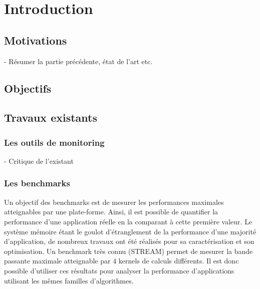 \section{Introduction} \label{sec:dev_intro}


\subsection{Motivations}



- Résumer la partie précédente, état de l'art etc.\\


\subsection{Objectifs}




\subsection{Travaux existants}\label{sec:dev_existant}

\subsubsection{Les outils de monitoring}

- Critique de l'existant\\


\subsubsection{Les benchmarks}

    Un objectif des benchmarks est de mesurer les performances maximales atteignables par une plate-forme. Ainsi, il est possible de quantifier la performance d'une application réelle en la comparant à cette première valeur. Le système mémoire étant le goulot d'étranglement de la performance d'une majorité d'application, de nombreux travaux ont été réalisés pour sa caractérisation et son optimisation. Un benchmark très connu (STREAM) permet de mesurer la bande passante maximale atteignable par 4 kernels de calculs différents. Il est donc possible d'utiliser ces résultats pour analyser la performance d'applications utilisant les mêmes familles d'algorithmes.



